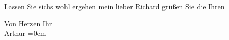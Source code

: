 \pstart
           Lassen Sie sichs wohl ergehen mein lieber Richard grüßen Sie die Ihren\pend
           
\pstart
           Von Herzen Ihr{\\[\baselineskip]}\spacefill\mbox{Arthur}\pend
           \leftskip=0em{}\endnumbering{}  \newcommand{\dateiname}{L02350}\newcommand{\titel}{Arthur Schnitzler an Richard Beer-Hofmann, 16. 7. 1920}\newcommand{\editorInnen}{Martin Anton Müller und Gerd-Hermann Susen}
